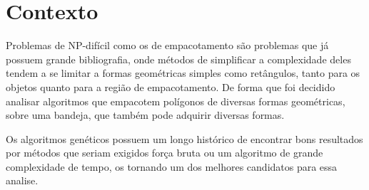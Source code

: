 \section{Contexto}
Problemas de NP-difícil\cite{wiki:np-haardness} como os de empacotamento são problemas que já possuem grande bibliografia, onde métodos de simplificar a complexidade deles tendem a se limitar a formas geométricas simples como retângulos, tanto para os objetos quanto para a região de empacotamento. De forma que foi decidido analisar algoritmos que empacotem polígonos de diversas formas
geométricas, sobre uma bandeja, que também pode adquirir diversas formas.\newline

\cite{book:genetic_algo_data_structure}Os algoritmos genéticos possuem um longo histórico de encontrar bons resultados
por métodos que seriam exigidos força bruta ou um algoritmo de grande complexidade de tempo, os tornando um dos melhores candidatos para essa analise.





